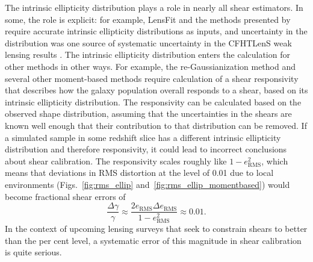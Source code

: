 \documentclass[twocolumn,useAMS,usenatbib]{mn2e}
\begin{document}
The intrinsic ellipticity distribution plays a role in nearly all
shear estimators.  In some, the role is explicit: for example, LensFit
\citep{2007MNRAS.382..315M,2008MNRAS.390..149K,2013MNRAS.429.2858M}
and the methods presented by \cite{2014MNRAS.438.1880B} require
accurate intrinsic ellipticity distributions as inputs, and
uncertainty in the distribution was one source of
systematic uncertainty in the CFHTLenS weak lensing results
\citep{2013MNRAS.432.2433H,2013MNRAS.429.2858M}.  The intrinsic
ellipticity distribution enters the calculation for other methods in
other ways.  For example, the re-Gaussianization method and several
other moment-based methods require calculation of a shear responsivity
\citep{BJ02,HS03} that describes how the galaxy population overall
responds to a shear, based on its intrinsic ellipticity distribution.
The responsivity can be calculated based on the observed shape
distribution, assuming that the uncertainties in the shears are known
well enough that their contribution to that distribution can be removed.
If a simulated sample in some redshift slice has a different intrinsic
ellipticity distribution and therefore responsivity, it could lead to
incorrect conclusions about shear calibration.  The responsivity
scales roughly like $1-e_\text{RMS}^2$, which means that deviations in
RMS distortion at the level of 0.01 due to local environments (Figs.~\ref{fig:rms_ellip} and~\ref{fig:rms_ellip_momentbased}) would become fractional shear
errors of
\begin{equation}
\frac{\Delta\gamma}{\gamma} \approx \frac{2 e_\text{RMS} \Delta
  e_\text{RMS} }{1-e_\text{RMS}^2} \approx 0.01.
\end{equation}
In the context of upcoming lensing surveys that seek to constrain
shears to better than the per cent level, a systematic error of this
magnitude in shear calibration is quite serious.
\end{document}
